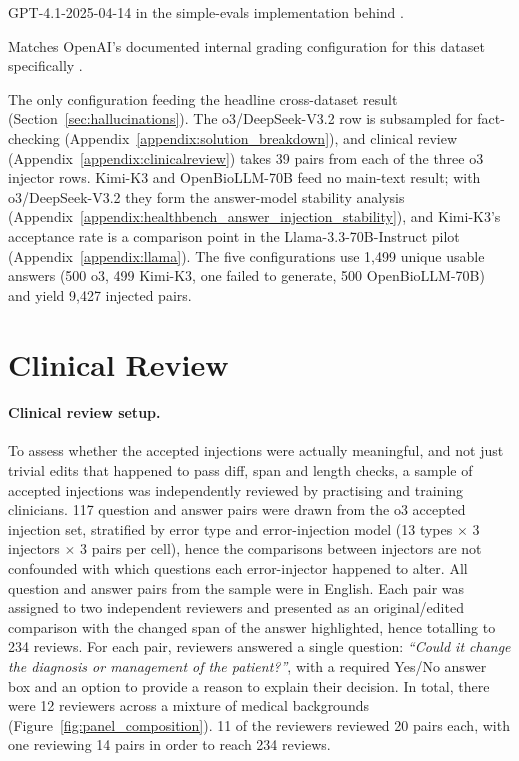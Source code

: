 \documentclass{article}
\newcommand{\appendixsection}[1]{%
  \section{#1}%
  \addcontentsline{apc}{section}{\protect\numberline{\thesection}#1}%
}
\begin{document}
\begin{table}[H]
\begin{threeparttable}
\begin{tablenotes}[flushleft]
  GPT-4.1-2025-04-14 in the simple-evals implementation
  behind \citep{arorahealthbench2025}.
\item[c] Matches OpenAI's documented internal grading configuration for
  this dataset specifically \citep{hicks2026healthbench}.
\item[d] The only configuration feeding the headline cross-dataset
  result (Section~\ref{sec:hallucinations}). The
  o3/DeepSeek-V3.2 row is subsampled for fact-checking
  (Appendix~\ref{appendix:solution_breakdown}), and clinical review
  (Appendix~\ref{appendix:clinicalreview}) takes 39 pairs from each of the
  three o3 injector rows. Kimi-K3 and
  OpenBioLLM-70B feed no main-text result; with
  o3/DeepSeek-V3.2 they form the answer-model stability
  analysis (Appendix~\ref{appendix:healthbench_answer_injection_stability}),
  and Kimi-K3's acceptance rate is a comparison point in the
  Llama-3.3-70B-Instruct pilot (Appendix~\ref{appendix:llama}). The five
  configurations use 1,499 unique usable answers (500 o3, 499
  Kimi-K3, one failed to generate, 500 OpenBioLLM-70B)
  and yield 9,427 injected pairs.
\end{tablenotes}
\end{threeparttable}
\end{table}

\newpage
\onecolumn
\appendixsection{Clinical Review}\label{appendix:clinicalreview}

\paragraph{Clinical review setup.} To assess whether the accepted injections were actually meaningful, and not just trivial edits that happened to pass diff, span and length checks, a sample of accepted injections was independently reviewed by practising and training clinicians. 117 question and answer pairs were drawn from the o3 accepted injection set, stratified by error type and error-injection model (13 types $\times$ 3 injectors $\times$ 3 pairs per cell), hence the comparisons between injectors are not confounded with which questions each error-injector happened to alter. All question and answer pairs from the sample were in English. Each pair was assigned to two independent reviewers and presented as an original/edited comparison with the changed span of the answer highlighted, hence totalling to 234 reviews. For each pair, reviewers answered a single question: \textit{``Could it change the diagnosis or management of the patient?''}, with a required Yes/No answer box and an option to provide a reason to explain their decision. In total, there were 12 reviewers across a mixture of medical backgrounds (Figure~\ref{fig:panel_composition}). 11 of the reviewers reviewed 20 pairs each, with one reviewing 14 pairs in order to reach 234 reviews.
\end{document}
